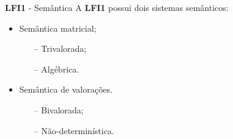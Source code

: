 \documentclass[xcolor=table]{beamer}
\newcommand{\lfium}{{\normalfont\textbf{LFI1}}}
\begin{document}
    \begin{frame}{\lfium{} {-} Semântica}
        A \lfium{} possui dois sistemas semânticos:
        \begin{itemize}
            \item Semântica matricial;
            \begin{itemize}
                \item [--] Trivalorada;
                \item [--] Algébrica.
            \end{itemize}
            \item Semântica de valorações.
            \begin{itemize}
                \item [--] Bivalorada;
                \item [--] Não-determinística.
            \end{itemize}
        \end{itemize}
    \end{frame}
\end{document}
